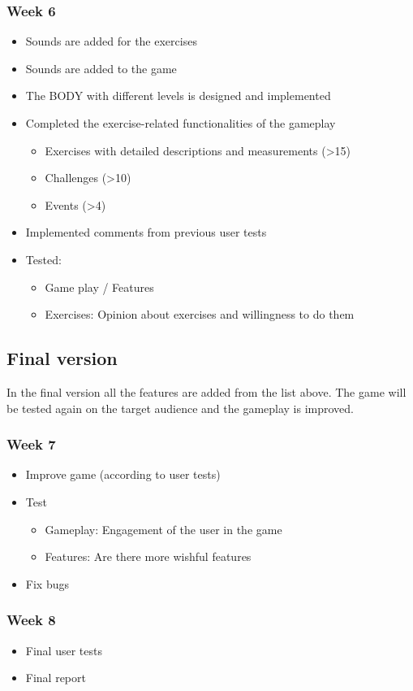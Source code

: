\documentclass[a4paper,11pt,notitlepage]{report}
\begin{document}
\subsubsection{Week 6}
\begin{itemize}
\item Sounds are added for the exercises
\item Sounds are added to the game
\item The BODY with different levels is designed and implemented
\item Completed the exercise-related functionalities of the gameplay
\begin{itemize} 
\item Exercises with detailed descriptions and measurements (>15) 
\item Challenges (>10)
\item Events (>4)
\end{itemize}
\item Implemented comments from previous user tests
\item Tested:
\begin{itemize}
\item Game play / Features
\item Exercises: Opinion about exercises and willingness to do them
\end{itemize}
\end{itemize}
\subsection{Final version}
In the final version all the features are added from the list above. The game will be tested again on the target audience and the gameplay is improved.
\subsubsection{Week 7}
\begin{itemize}
\item Improve game (according to user tests)
\item Test
\begin{itemize}
\item Gameplay: Engagement of the user in the game
\item Features: Are there more wishful features
\end{itemize}
\item Fix bugs
\end{itemize}
\subsubsection{Week 8}
\begin{itemize}
\item Final user tests
\item Final report
\end{itemize}
\end{document}
